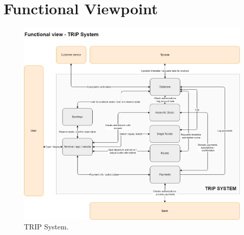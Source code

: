 \section{Functional Viewpoint}
\begin{figure}[H]
    \centering
    \includegraphics[width=\textwidth]{drawings/views_draft3/functional_view.png}
    \caption{TRIP System.}
    \label{fig:trip_system}
\end{figure}

